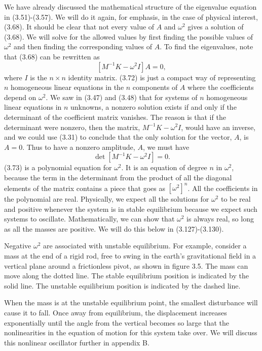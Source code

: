 \documentclass[main.tex]{subfiles}
\begin{document}
We have already discussed the mathematical structure of the eigenvalue equation in (3.51)-(3.57). We will do it again, for emphasis, in the case of physical interest, (3.68). It should be clear that not every value of $A$ and $\omega^2$ gives a solution of (3.68). We will solve for the allowed values by first finding the possible values of $\omega^2$ and then finding the corresponding values of $A$. To find the eigenvalues, note that (3.68) can be rewritten as
$$
\left[M^{-1} K-\omega^2 I\right] A=0,
$$
where $I$ is the $n \times n$ identity matrix. (3.72) is just a compact way of representing $n$ homogeneous linear equations in the $n$ components of $A$ where the coefficients depend on $\omega^2$. We saw in (3.47) and (3.48) that for systems of $n$ homogeneous linear equations in $n$ unknowns, a nonzero solution exists if and only if the determinant of the coefficient matrix vanishes. The reason is that if the determinant were nonzero, then the matrix, $M^{-1} K-\omega^2 I$, would have an inverse, and we could use (3.31) to conclude that the only solution for the vector, $A$, is $A=0$. Thus to have a nonzero amplitude, $A$, we must have
$$
\operatorname{det}\left[M^{-1} K-\omega^2 I\right]=0 .
$$
(3.73) is a polynomial equation for $\omega^2$. It is an equation of degree $n$ in $\omega^2$, because the term in the determinant from the product of all the diagonal elements of the matrix contains a piece that goes as $\left[\omega^2\right]^n$. All the coefficients in the polynomial are real. Physically, we expect all the solutions for $\omega^2$ to be real and positive whenever the system is in stable equilibrium because we expect such systems to oscillate. Mathematically, we can show that $\omega^2$ is always real, so long as all the masses are positive. We will do this below in (3.127)-(3.130).

Negative $\omega^2$ are associated with unstable equilibrium. For example, consider a mass at the end of a rigid rod, free to swing in the earth's gravitational field in a vertical plane around a frictionless pivot, as shown in figure 3.5. The mass can move along the dotted line. The stable equilibrium position is indicated by the solid line. The unstable equilibrium position is indicated by the dashed line.

When the mass is at the unstable equilibrium point, the smallest disturbance will cause it to fall. Once away from equilibrium, the displacement increases exponentially until the angle from the vertical becomes so large that the nonlinearities in the equation of motion for this system take over. We will discuss this nonlinear oscillator further in appendix B.
\end{document}
